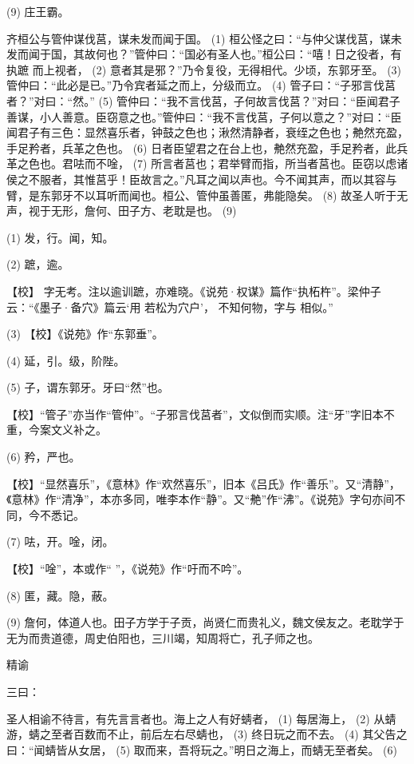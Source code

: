 \documentclass[12pt,UTF8]{ctexbook}
\begin{document}
(9) 庄王霸。

齐桓公与管仲谋伐莒，谋未发而闻于国。 (1) 桓公怪之曰：“与仲父谋伐莒，谋未发而闻于国，其故何也？”管仲曰：“国必有圣人也。”桓公曰：“嘻！日之役者，有执蹠 而上视者， (2) 意者其是邪？”乃令复役，无得相代。少顷，东郭牙至。 (3) 管仲曰：“此必是已。”乃令宾者延之而上，分级而立。 (4) 管子曰：“子邪言伐莒者？”对曰：“然。” (5) 管仲曰：“我不言伐莒，子何故言伐莒？”对曰：“臣闻君子善谋，小人善意。臣窃意之也。”管仲曰：“我不言伐莒，子何以意之？”对曰：“臣闻君子有三色：显然喜乐者，钟鼓之色也；湫然清静者，衰绖之色也；艴然充盈，手足矜者，兵革之色也。 (6) 日者臣望君之在台上也，艴然充盈，手足矜者，此兵革之色也。君呿而不唫， (7) 所言者莒也；君举臂而指，所当者莒也。臣窃以虑诸侯之不服者，其惟莒乎！臣故言之。”凡耳之闻以声也。今不闻其声，而以其容与臂，是东郭牙不以耳听而闻也。桓公、管仲虽善匿，弗能隐矣。 (8) 故圣人听于无声，视于无形，詹何、田子方、老耽是也。 (9)

(1) 发，行。闻，知。

(2) 蹠，逾。

【校】 字无考。注以逾训蹠，亦难晓。《说苑·权谋》篇作“执柘杵”。梁仲子云：“《墨子·备穴》篇云‘用 若松为穴户’， 不知何物，字与 相似。”

(3) 【校】《说苑》作“东郭垂”。

(4) 延，引。级，阶陛。

(5) 子，谓东郭牙。牙曰“然”也。

【校】“管子”亦当作“管仲”。“子邪言伐莒者”，文似倒而实顺。注“牙”字旧本不重，今案文义补之。

(6) 矜，严也。

【校】“显然喜乐”，《意林》作“欢然喜乐”，旧本《吕氏》作“善乐”。又“清静”，《意林》作“清净”，本亦多同，唯李本作“静”。又“艴”作“沸”。《说苑》字句亦间不同，今不悉记。

(7) 呿，开。唫，闭。

【校】“唫”，本或作“ ”，《说苑》作“吁而不吟”。

(8) 匿，藏。隐，蔽。

(9) 詹何，体道人也。田子方学于子贡，尚贤仁而贵礼义，魏文侯友之。老耽学于无为而贵道德，周史伯阳也，三川竭，知周将亡，孔子师之也。





精谕


三曰：

圣人相谕不待言，有先言言者也。海上之人有好蜻者， (1) 每居海上， (2) 从蜻游，蜻之至者百数而不止，前后左右尽蜻也， (3) 终日玩之而不去。 (4) 其父告之曰：“闻蜻皆从女居， (5) 取而来，吾将玩之。”明日之海上，而蜻无至者矣。 (6)
\end{document}
